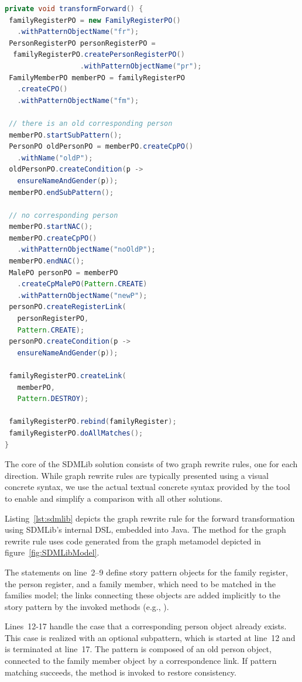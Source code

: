 \begin{lstlisting}[label={lst:sdmlib}, float=hbt!, language=java, caption={Forward transformation in SDMLib}]
private void transformForward() {
 familyRegisterPO = new FamilyRegisterPO()
   .withPatternObjectName("fr");
 PersonRegisterPO personRegisterPO = 
  familyRegisterPO.createPersonRegisterPO()
                  .withPatternObjectName("pr");
 FamilyMemberPO memberPO = familyRegisterPO
   .createCPO()
   .withPatternObjectName("fm");

 // there is an old corresponding person
 memberPO.startSubPattern();
 PersonPO oldPersonPO = memberPO.createCpPO()
   .withName("oldP");
 oldPersonPO.createCondition(p -> 
   ensureNameAndGender(p));
 memberPO.endSubPattern();

 // no corresponding person
 memberPO.startNAC();
 memberPO.createCpPO()
   .withPatternObjectName("noOldP");
 memberPO.endNAC();
 MalePO personPO = memberPO
   .createCpMalePO(Pattern.CREATE)
   .withPatternObjectName("newP");
 personPO.createRegisterLink(
   personRegisterPO, 
   Pattern.CREATE);
 personPO.createCondition(p -> 
   ensureNameAndGender(p));
    
 familyRegisterPO.createLink(
   memberPO, 
   Pattern.DESTROY);

 familyRegisterPO.rebind(familyRegister);
 familyRegisterPO.doAllMatches();	    
}
\end{lstlisting}

The core of the SDMLib solution consists of two graph rewrite rules, one for each direction.
While graph rewrite rules are typically presented using a visual concrete syntax, we use the actual textual concrete syntax provided by the tool to enable and simplify a comparison with all other solutions.  

Listing~\ref{lst:sdmlib} depicts the graph rewrite rule for the forward transformation using SDMLib's internal DSL, embedded into Java.
The method for the graph rewrite rule uses code generated from the graph metamodel depicted in figure~\ref{fig:SDMLibModel}. 

The statements on line~2--9 define story pattern objects for the family register, the person register, and a family member, which need to be matched in the families model; the links connecting these objects are added implicitly to the story pattern by the invoked methods (e.g., ). 

Lines~12-17 handle the case that a corresponding person object already exists.
This case is realized with an optional subpattern, which is started at line~12 and is terminated at line~17.
The pattern is composed of an old person object, connected to the family member object by a correspondence link.
If pattern matching succeeds, the method  is invoked to restore consistency.

